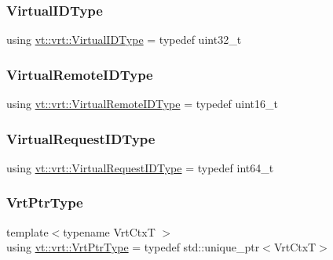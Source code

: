\mbox{\label{namespacevt_1_1vrt_a84d0891f52f70728c3fc2172cffb464b}} 
\subsubsection{\texorpdfstring{Virtual\+I\+D\+Type}{VirtualIDType}}
{\footnotesize\ttfamily using \hyperlink{namespacevt_1_1vrt_a84d0891f52f70728c3fc2172cffb464b}{vt\+::vrt\+::\+Virtual\+I\+D\+Type} = typedef uint32\+\_\+t}

\mbox{\label{namespacevt_1_1vrt_a8184ab8c530ce523edcdc4f4c38565be}} 
\subsubsection{\texorpdfstring{Virtual\+Remote\+I\+D\+Type}{VirtualRemoteIDType}}
{\footnotesize\ttfamily using \hyperlink{namespacevt_1_1vrt_a8184ab8c530ce523edcdc4f4c38565be}{vt\+::vrt\+::\+Virtual\+Remote\+I\+D\+Type} = typedef uint16\+\_\+t}

\mbox{\label{namespacevt_1_1vrt_ac7ef8820ebfc383fa16f09bf46eaa2b8}} 
\subsubsection{\texorpdfstring{Virtual\+Request\+I\+D\+Type}{VirtualRequestIDType}}
{\footnotesize\ttfamily using \hyperlink{namespacevt_1_1vrt_ac7ef8820ebfc383fa16f09bf46eaa2b8}{vt\+::vrt\+::\+Virtual\+Request\+I\+D\+Type} = typedef int64\+\_\+t}

\mbox{\label{namespacevt_1_1vrt_a5567b830b7fd81a29e7d3593511721b9}} 
\subsubsection{\texorpdfstring{Vrt\+Ptr\+Type}{VrtPtrType}}
{\footnotesize\ttfamily template$<$typename Vrt\+CtxT $>$ \\
using \hyperlink{namespacevt_1_1vrt_a5567b830b7fd81a29e7d3593511721b9}{vt\+::vrt\+::\+Vrt\+Ptr\+Type} = typedef std\+::unique\+\_\+ptr$<$Vrt\+CtxT$>$}



